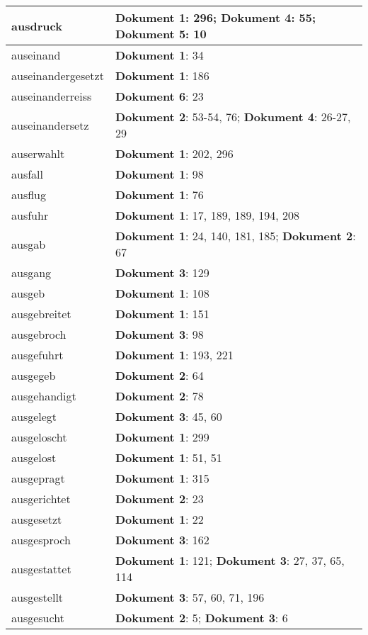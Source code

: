 \documentclass[a5paper]{article}
\begin{document}
\begin{longtable}[l]{|l|p{3in}|}
\hline
ausdruck & \textbf{Dokument 1}: 296; \textbf{Dokument 4}: 55; \textbf{Dokument 5}: 10 \\
\hline
auseinand & \textbf{Dokument 1}: 34 \\
\hline
auseinandergesetzt & \textbf{Dokument 1}: 186 \\
\hline
auseinanderreiss & \textbf{Dokument 6}: 23 \\
\hline
auseinandersetz & \textbf{Dokument 2}: 53-54, 76; \textbf{Dokument 4}: 26-27, 29 \\
\hline
auserwahlt & \textbf{Dokument 1}: 202, 296 \\
\hline
ausfall & \textbf{Dokument 1}: 98 \\
\hline
ausflug & \textbf{Dokument 1}: 76 \\
\hline
ausfuhr & \textbf{Dokument 1}: 17, 189, 189, 194, 208 \\
\hline
ausgab & \textbf{Dokument 1}: 24, 140, 181, 185; \textbf{Dokument 2}: 67 \\
\hline
ausgang & \textbf{Dokument 3}: 129 \\
\hline
ausgeb & \textbf{Dokument 1}: 108 \\
\hline
ausgebreitet & \textbf{Dokument 1}: 151 \\
\hline
ausgebroch & \textbf{Dokument 3}: 98 \\
\hline
ausgefuhrt & \textbf{Dokument 1}: 193, 221 \\
\hline
ausgegeb & \textbf{Dokument 2}: 64 \\
\hline
ausgehandigt & \textbf{Dokument 2}: 78 \\
\hline
ausgelegt & \textbf{Dokument 3}: 45, 60 \\
\hline
ausgeloscht & \textbf{Dokument 1}: 299 \\
\hline
ausgelost & \textbf{Dokument 1}: 51, 51 \\
\hline
ausgepragt & \textbf{Dokument 1}: 315 \\
\hline
ausgerichtet & \textbf{Dokument 2}: 23 \\
\hline
ausgesetzt & \textbf{Dokument 1}: 22 \\
\hline
ausgesproch & \textbf{Dokument 3}: 162 \\
\hline
ausgestattet & \textbf{Dokument 1}: 121; \textbf{Dokument 3}: 27, 37, 65, 114 \\
\hline
ausgestellt & \textbf{Dokument 3}: 57, 60, 71, 196 \\
\hline
ausgesucht & \textbf{Dokument 2}: 5; \textbf{Dokument 3}: 6 \\

\end{longtable}
\end{document}
